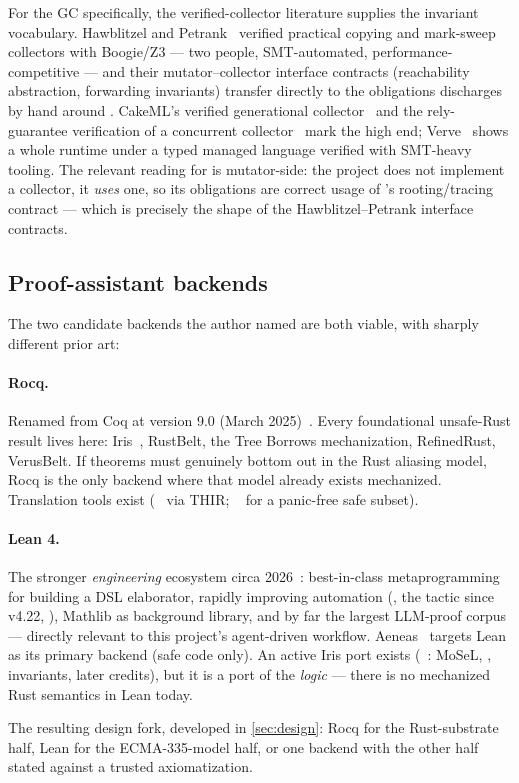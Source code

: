 For the GC specifically, the verified-collector literature supplies the
invariant vocabulary. Hawblitzel and Petrank~\cite{hawblitzelpetrank2009}
verified practical copying and mark-sweep collectors with Boogie/Z3 ---
two people, SMT-automated, performance-competitive --- and their
mutator--collector interface contracts (reachability abstraction,
forwarding invariants) transfer directly to the obligations \dotnetrs{}
discharges by hand around \gcarena{}. CakeML's verified generational
collector~\cite{cakemlgc2019} and the rely-guarantee verification of a
concurrent collector~\cite{zakowski2018} mark the high end;
Verve~\cite{verve2010} shows a whole runtime under a typed managed
language verified with SMT-heavy tooling. The relevant reading for
\dotnetrs{} is mutator-side: the project does not implement a collector,
it \emph{uses} one, so its obligations are correct usage of \gcarena{}'s
rooting/tracing contract --- which is precisely the shape of the
Hawblitzel--Petrank interface contracts.

\subsection{Proof-assistant backends}
\label{sec:prior-backends}

The two candidate backends the author named are both viable, with sharply
different prior art:

\paragraph{Rocq.} Renamed from Coq at version 9.0 (March
2025)~\cite{rocq}. Every foundational unsafe-Rust result lives here:
Iris~\cite{iris2018}, RustBelt, the Tree Borrows mechanization,
RefinedRust, VerusBelt. If theorems must genuinely bottom out in the Rust
aliasing model, Rocq is the only backend where that model already exists
mechanized. Translation tools exist (~\cite{rocqofrust}
via THIR; ~\cite{hax} for a panic-free safe subset).

\paragraph{Lean 4.} The stronger \emph{engineering} ecosystem circa
2026~\cite{lean4}: best-in-class metaprogramming for building a DSL
elaborator, rapidly improving automation (, the 
tactic since v4.22, ), Mathlib as background library, and
by far the largest LLM-proof corpus --- directly relevant to this
project's agent-driven workflow. Aeneas~\cite{aeneas2022} targets Lean as
its primary backend (safe code only). An active Iris port
exists (~\cite{irislean}: MoSeL, ,
invariants, later credits), but it is a port of the \emph{logic} --- there
is no mechanized Rust semantics in Lean today.

The resulting design fork, developed in \cref{sec:design}: Rocq for
the Rust-substrate half, Lean for the ECMA-335-model half, or one
backend with the other half stated against a trusted axiomatization.
